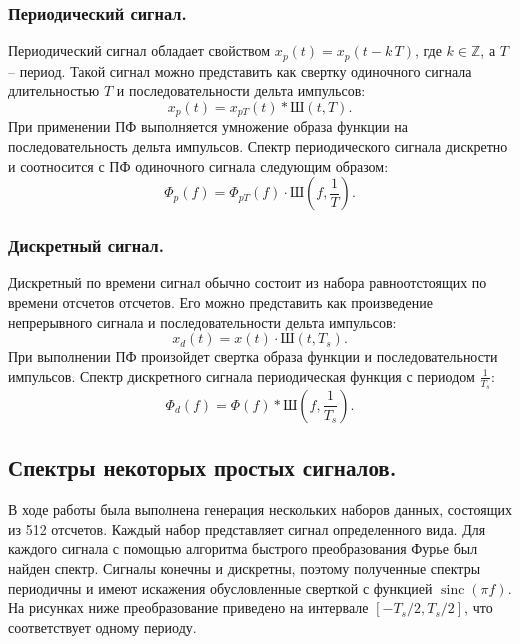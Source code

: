 \documentclass[a4paper,14pt]{extarticle}
\DeclareMathOperator{\sinc}{sinc}
\begin{document}
\subsubsection{Периодический сигнал.}

Периодический сигнал обладает свойством $x_p(t) = x_p(t - k\,T)$, где $ k \in \mathbb{Z}$, а $T$ -- период. Такой сигнал можно представить как свертку одиночного сигнала длительностью $T$ и последовательности дельта импульсов:
\begin{equation*}
x_p(t) = x_{pT}(t) * \text{Ш}(t, T).
\end{equation*}
При применении ПФ выполняется умножение образа функции на последовательность дельта импульсов. Спектр периодического сигнала дискретно и соотносится с ПФ одиночного сигнала следующим образом:
\begin{equation*}
\Phi_p(f) = \Phi_{pT}(f) \cdot \text{Ш}(f, \frac{1}{T}).
\end{equation*}

\subsubsection{Дискретный сигнал.}

Дискретный по времени сигнал обычно состоит из набора равноотстоящих по времени отсчетов отсчетов. Его можно представить как произведение непрерывного сигнала и последовательности дельта импульсов:
\begin{equation*}
x_d(t) = x(t) \cdot \text{Ш}(t, T_s).
\end{equation*}
При выполнении ПФ произойдет свертка образа функции и последовательности импульсов. Спектр дискретного сигнала периодическая функция с периодом $\frac{1}{T_s}$:
\begin{equation*}
\Phi_d(f) = \Phi(f) * \text{Ш}(f, \frac{1}{T_s}).
\end{equation*}

\subsection{Спектры некоторых простых сигналов.}

В ходе работы была выполнена генерация нескольких наборов данных, состоящих из 512 отсчетов. Каждый набор представляет сигнал определенного вида. Для каждого сигнала с помощью алгоритма быстрого преобразования Фурье был найден спектр. Сигналы конечны и дискретны, поэтому полученные спектры периодичны и имеют искажения обусловленные сверткой с функцией $\sinc(\pi f)$. На рисунках ниже преобразование приведено на интервале $[-T_s / 2, T_s/2]$, что соответствует одному периоду.  
\end{document}
